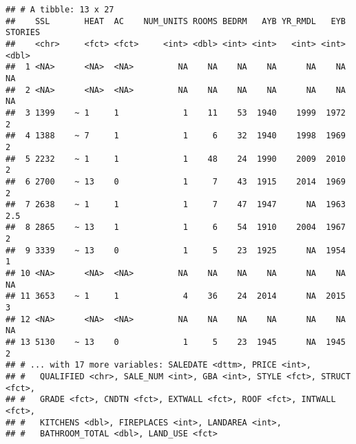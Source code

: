 \documentclass[]{article}
\newenvironment{Shaded}{\begin{snugshade}}{\end{snugshade}}
\newcommand{\CommentTok}[1]{\textcolor[rgb]{0.56,0.35,0.01}{\textit{#1}}}
\newcommand{\DecValTok}[1]{\textcolor[rgb]{0.00,0.00,0.81}{#1}}
\newcommand{\NormalTok}[1]{#1}
\newcommand{\OperatorTok}[1]{\textcolor[rgb]{0.81,0.36,0.00}{\textbf{#1}}}
\newcommand{\StringTok}[1]{\textcolor[rgb]{0.31,0.60,0.02}{#1}}
\begin{document}
\begin{Shaded}
\end{Shaded}

\begin{verbatim}
## # A tibble: 13 x 27
##    SSL       HEAT  AC    NUM_UNITS ROOMS BEDRM   AYB YR_RMDL   EYB STORIES
##    <chr>     <fct> <fct>     <int> <dbl> <int> <int>   <int> <int>   <dbl>
##  1 <NA>      <NA>  <NA>         NA    NA    NA    NA      NA    NA    NA  
##  2 <NA>      <NA>  <NA>         NA    NA    NA    NA      NA    NA    NA  
##  3 1399    ~ 1     1             1    11    53  1940    1999  1972     2  
##  4 1388    ~ 7     1             1     6    32  1940    1998  1969     2  
##  5 2232    ~ 1     1             1    48    24  1990    2009  2010     2  
##  6 2700    ~ 13    0             1     7    43  1915    2014  1969     2  
##  7 2638    ~ 1     1             1     7    47  1947      NA  1963     2.5
##  8 2865    ~ 13    1             1     6    54  1910    2004  1967     2  
##  9 3339    ~ 13    0             1     5    23  1925      NA  1954     1  
## 10 <NA>      <NA>  <NA>         NA    NA    NA    NA      NA    NA    NA  
## 11 3653    ~ 1     1             4    36    24  2014      NA  2015     3  
## 12 <NA>      <NA>  <NA>         NA    NA    NA    NA      NA    NA    NA  
## 13 5130    ~ 13    0             1     5    23  1945      NA  1945     2  
## # ... with 17 more variables: SALEDATE <dttm>, PRICE <int>,
## #   QUALIFIED <chr>, SALE_NUM <int>, GBA <int>, STYLE <fct>, STRUCT <fct>,
## #   GRADE <fct>, CNDTN <fct>, EXTWALL <fct>, ROOF <fct>, INTWALL <fct>,
## #   KITCHENS <dbl>, FIREPLACES <int>, LANDAREA <int>,
## #   BATHROOM_TOTAL <dbl>, LAND_USE <fct>
\end{verbatim}
\end{document}
